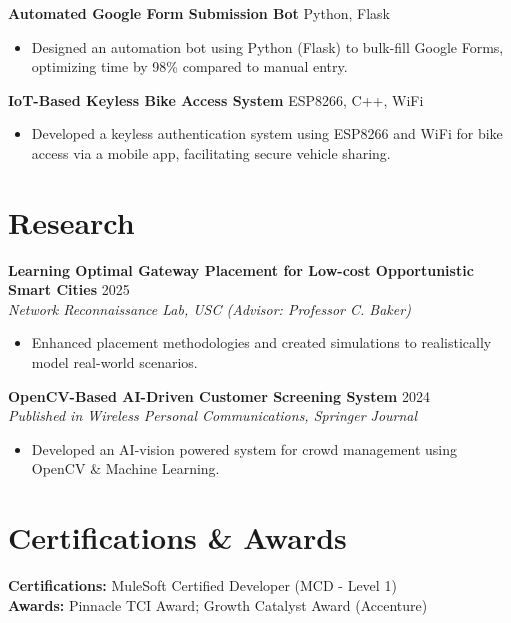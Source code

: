 \documentclass[letterpaper,10pt]{article}
\begin{document}
\vspace{4pt}

\textbf{Automated Google Form Submission Bot} \hfill Python, Flask
\begin{itemize}[leftmargin=*,noitemsep]
    \item Designed an automation bot using Python (Flask) to bulk-fill Google Forms, optimizing time by 98\% compared to manual entry.
\end{itemize}

\vspace{4pt}

\textbf{IoT-Based Keyless Bike Access System} \hfill ESP8266, C++, WiFi
\begin{itemize}[leftmargin=*,noitemsep]
    \item Developed a keyless authentication system using ESP8266 and WiFi for bike access via a mobile app, facilitating secure vehicle sharing.
\end{itemize}

\section*{Research}
\textbf{Learning Optimal Gateway Placement for Low-cost Opportunistic Smart Cities} \hfill 2025 \\
\textit{Network Reconnaissance Lab, USC (Advisor: Professor C. Baker)}
\begin{itemize}[leftmargin=*,noitemsep]
    \item Enhanced placement methodologies and created simulations to realistically model real-world scenarios.
\end{itemize}

\vspace{4pt}

\textbf{OpenCV-Based AI-Driven Customer Screening System} \hfill 2024 \\
\textit{Published in Wireless Personal Communications, Springer Journal}
\begin{itemize}[leftmargin=*,noitemsep]
    \item Developed an AI-vision powered system for crowd management using OpenCV \& Machine Learning.
\end{itemize}

\section*{Certifications \& Awards}
\textbf{Certifications:} MuleSoft Certified Developer (MCD - Level 1) \\
\textbf{Awards:} Pinnacle TCI Award; Growth Catalyst Award (Accenture)
\end{document}
